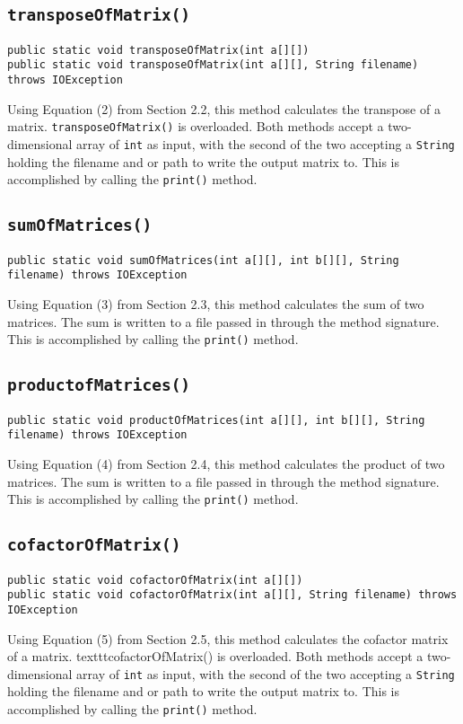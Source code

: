 \documentclass[12pt]{article}
\begin{document}
\subsection{\texttt{transposeOfMatrix()}}
\begin{verbatim}
public static void transposeOfMatrix(int a[][])
public static void transposeOfMatrix(int a[][], String filename) throws IOException
\end{verbatim}
Using Equation (2) from Section 2.2, this method calculates the transpose of a matrix. \texttt{transposeOfMatrix()} is overloaded. Both methods accept a two-dimensional array of \texttt{int} as input, with the second of the two accepting a \texttt{String} holding the filename and or path to write the output matrix to. This is accomplished by calling the \texttt{print()} method.

\subsection{\texttt{sumOfMatrices()}}
\begin{verbatim}
public static void sumOfMatrices(int a[][], int b[][], String filename) throws IOException
\end{verbatim}
Using Equation (3) from Section 2.3, this method calculates the sum of two matrices. The sum is written to a file passed in through the method signature. This is accomplished by calling the \texttt{print()} method.

\subsection{\texttt{productofMatrices()}}
\begin{verbatim}
public static void productOfMatrices(int a[][], int b[][], String filename) throws IOException
\end{verbatim}
Using Equation (4) from Section 2.4, this method calculates the product of two matrices. The sum is written to a file passed in through the method signature. This is accomplished by calling the \texttt{print()} method.

\subsection{\texttt{cofactorOfMatrix()}}
\begin{verbatim}
public static void cofactorOfMatrix(int a[][])
public static void cofactorOfMatrix(int a[][], String filename) throws IOException
\end{verbatim}
Using Equation (5) from Section 2.5, this method calculates the cofactor matrix of a matrix. texttt{cofactorOfMatrix()} is overloaded. Both methods accept a two-dimensional array of \texttt{int} as input, with the second of the two accepting a \texttt{String} holding the filename and or path to write the output matrix to. This is accomplished by calling the \texttt{print()} method.
\end{document}
